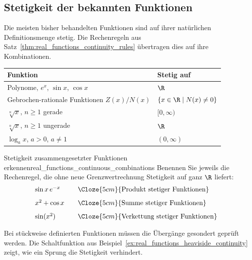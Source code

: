 \subsection{Stetigkeit der bekannten Funktionen}
\label{subsec:real_functions_elementary_continuity}
Die meisten bisher behandelten Funktionen sind auf ihrer natürlichen
Definitionsmenge stetig. Die Rechenregeln aus
Satz~\ref{thm:real_functions_continuity_rules} übertragen dies auf ihre Kombinationen.
\begin{center}
  \renewcommand{\arraystretch}{1.4}
  \begin{tabular}{@{}ll@{}}
    \toprule
    Funktion & Stetig auf\\\midrule
    Polynome, $e^x$, $\sin x$, $\cos x$ & $\R$\\
    Gebrochen-rationale Funktionen $Z(x)/N(x)$ & $\{x\in\R\mid N(x)\ne0\}$\\
    $\sqrt[n]{x}$, $n\ge1$ gerade & $[0,\infty)$\\
    $\sqrt[n]{x}$, $n\ge1$ ungerade & $\R$\\
    $\log_a x$, $a>0$, $a\ne1$ & $(0,\infty)$\\
    \bottomrule
  \end{tabular}
\end{center}
\begin{ExampleBox}{Stetigkeit zusammengesetzter Funktionen erkennen}{real_functions_continuous_combinations}
  Benennen Sie jeweils die Rechenregel, die ohne neue Grenzwertrechnung
  Stetigkeit auf ganz $\R$ liefert:
  \[
    \begin{array}{l@{\qquad}l}
      \sin x\,e^{-x}&\Cloze{5cm}{\text{Produkt stetiger Funktionen}}\\[0.8em]
      x^2+\cos x&\Cloze{5cm}{\text{Summe stetiger Funktionen}}\\[0.8em]
      \sin(x^2)&\Cloze{5cm}{\text{Verkettung stetiger Funktionen}}
    \end{array}
  \]
\end{ExampleBox}
Bei stückweise definierten Funktionen müssen die Übergänge gesondert
geprüft werden. Die Schaltfunktion aus
Beispiel~\ref{ex:real_functions_heaviside_continuity} zeigt, wie ein Sprung die Stetigkeit verhindert.
